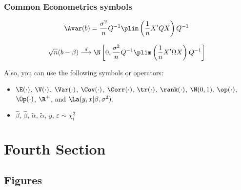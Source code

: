 \documentclass[aspectratio=169,xcolor=dvipsnames]{beamer}
\begin{document}
\begin{frame}
    \frametitle{Common Econometrics symbols}

    \begin{equation}
        \Avar (b) = \frac{\sigma^2}{n} Q^{-1} \plim \left( \frac{1}{n}X'QX \right)Q^{-1}
    \end{equation}

    \begin{equation}
        \sqrt{n}(b-\beta) \stackrel{d}{\longrightarrow} \N \left[0,\frac{\sigma^2}{n} Q^{-1} \plim \left( \frac{1}{n}X'\Omega X\right)Q^{-1}\right]
    \end{equation}

    Also, you can use the following symbols or operators:
    \begin{itemize}
        \item $\E(\cdot)$, $\V(\cdot)$, $\Var(\cdot)$, $\Cov(\cdot)$, $\Corr(\cdot)$, $\tr(\cdot)$, $\rank(\cdot)$, $\N(0,1)$, $\op(\cdot)$, $\Op(\cdot)$, $\R^+$, and $\La(y,x|\beta,\sigma^2)$.
        \item $\hat \beta$, $\widehat \beta$, $\tilde \alpha$, $\widetilde \alpha$, $\bar y$, $\varepsilon \sim \chi^2_t$
    \end{itemize}

\end{frame}

\section{Fourth Section}

\subsection{Figures}

\end{document}
